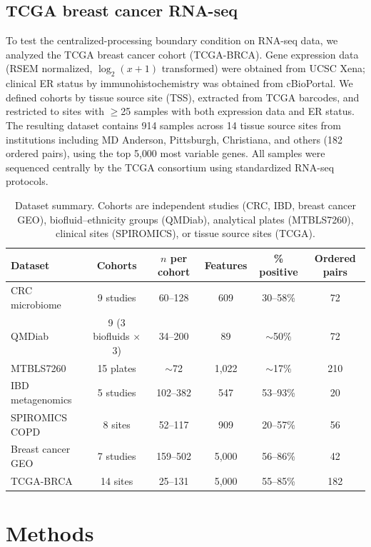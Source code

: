 \documentclass{article}
\begin{document}
\subsection{TCGA breast cancer RNA-seq}
\label{sec:tcga_data}

To test the centralized-processing boundary condition on RNA-seq data, we analyzed the TCGA breast cancer cohort (TCGA-BRCA). Gene expression data (RSEM normalized, $\log_2(x+1)$ transformed) were obtained from UCSC Xena; clinical ER status by immunohistochemistry was obtained from cBioPortal. We defined cohorts by tissue source site (TSS), extracted from TCGA barcodes, and restricted to sites with $\geq$25 samples with both expression data and ER status. The resulting dataset contains 914 samples across 14 tissue source sites from institutions including MD Anderson, Pittsburgh, Christiana, and others (182 ordered pairs), using the top 5{,}000 most variable genes. All samples were sequenced centrally by the TCGA consortium using standardized RNA-seq protocols.

\begin{table}[t]
\centering
\caption{Dataset summary. Cohorts are independent studies (CRC, IBD, breast cancer GEO), biofluid--ethnicity groups (QMDiab), analytical plates (MTBLS7260), clinical sites (SPIROMICS), or tissue source sites (TCGA).}
\label{tab:cohorts}
\begin{tabular}{lccccc}
\toprule
Dataset & Cohorts & $n$ per cohort & Features & \% positive & Ordered pairs \\
\midrule
CRC microbiome & 9 studies & 60--128 & 609 & 30--58\% & 72 \\
QMDiab & 9 (3 biofluids $\times$ 3) & 34--200 & 89 & $\sim$50\% & 72 \\
MTBLS7260 & 15 plates & $\sim$72 & 1{,}022 & $\sim$17\% & 210 \\
IBD metagenomics & 5 studies & 102--382 & 547 & 53--93\% & 20 \\
SPIROMICS COPD & 8 sites & 52--117 & 909 & 20--57\% & 56 \\
Breast cancer GEO & 7 studies & 159--502 & 5{,}000 & 56--86\% & 42 \\
TCGA-BRCA & 14 sites & 25--131 & 5{,}000 & 55--85\% & 182 \\
\bottomrule
\end{tabular}
\end{table}


\section{Methods}
\label{sec:methods}
\end{document}
